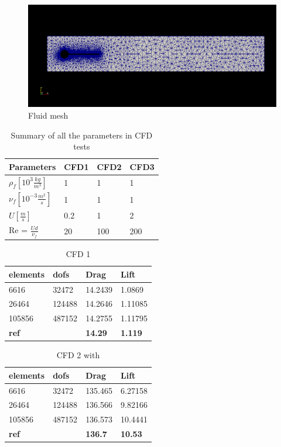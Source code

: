 \begin{figure}[H]
\caption{Fluid mesh}
\includegraphics[scale=0.5,trim={24mm 46mm 14mm 40mm},clip]{./Verification_Validation/Hron_Turek/fluid.png}
\end{figure}

\vspace{1cm}

\begin{table}[H]
\centering
\caption{Summary of all the parameters in CFD tests}
\label{my-label}
\begin{tabular}{|l|l|l|l|}
\hline
Parameters & CFD1 & CFD2 & CFD3 \\ \hline
$\rho_f [10^3 \frac{kg}{m^3}]$ & 1 & 1 & 1 \\ \hline
$\nu_f [10^{-3} \frac{m^2}{s}]$ & 1 & 1 & 1 \\ \hline
$ U [\frac{m}{s}] $ & 0.2 & 1 & 2 \\ \hline
Re = $\frac{Ud}{\nu_f}$ & 20 & 100 & 200 \\ \hline
\end{tabular}
\end{table}

\begin{table}[H]
\centering
\caption{CFD 1}
\label{my-label}
\begin{tabular}{|l|l|l|l|}
\hline
\textbf{elements} & \textbf{dofs} & \textbf{Drag} & \textbf{Lift} \\ \hline
6616 & 32472 & 14.2439 & 1.0869 \\ \hline
26464 & 124488 & 14.2646 & 1.11085 \\ \hline
105856 & 487152 & 14.2755 & 1.11795 \\ \hline
\textbf{ref} & \textbf{} & \textbf{14.29} & \textbf{1.119} \\ \hline
\end{tabular}
\end{table}

\begin{table}[H]
\centering
\caption{CFD 2 with }
\label{my-label}
\begin{tabular}{|l|l|l|l|}
\hline
\textbf{elements} & \textbf{dofs} & \textbf{Drag} & \textbf{Lift} \\ \hline
6616 & 32472 & 135.465 & 6.27158 \\ \hline
26464 & 124488 & 136.566 & 9.82166 \\ \hline
105856 & 487152 & 136.573 & 10.4441 \\ \hline
\textbf{ref} & \textbf{} & \textbf{136.7} & \textbf{10.53} \\ \hline
\end{tabular}
\end{table}

